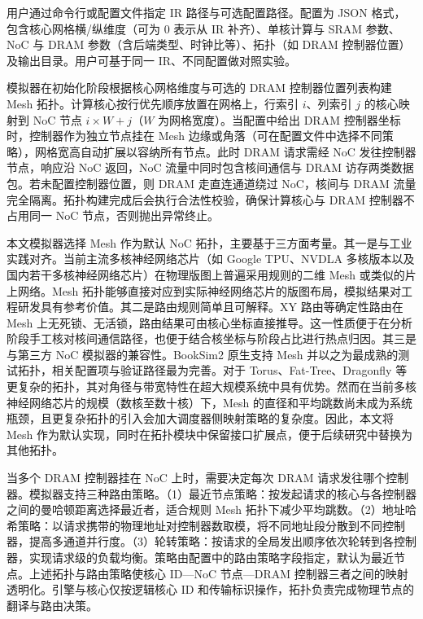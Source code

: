 
用户通过命令行或配置文件指定 IR 路径与可选配置路径。配置为 JSON 格式，包含核心网格横/纵维度（可为 0 表示从 IR 补齐）、单核计算与 SRAM 参数、NoC 与 DRAM 参数（含后端类型、时钟比等）、拓扑（如 DRAM 控制器位置）及输出目录。用户可基于同一 IR、不同配置做对照实验。

模拟器在初始化阶段根据核心网格维度与可选的 DRAM 控制器位置列表构建 Mesh 拓扑。计算核心按行优先顺序放置在网格上，行索引 $i$、列索引 $j$ 的核心映射到 NoC 节点 $i \times W + j$（$W$ 为网格宽度）。当配置中给出 DRAM 控制器坐标时，控制器作为独立节点挂在 Mesh 边缘或角落（可在配置文件中选择不同策略），网格宽高自动扩展以容纳所有节点。此时 DRAM 请求需经 NoC 发往控制器节点，响应沿 NoC 返回，NoC 流量中同时包含核间通信与 DRAM 访存两类数据包。若未配置控制器位置，则 DRAM 走直连通道绕过 NoC，核间与 DRAM 流量完全隔离。拓扑构建完成后会执行合法性校验，确保计算核心与 DRAM 控制器不占用同一 NoC 节点，否则抛出异常终止。

本文模拟器选择 Mesh 作为默认 NoC 拓扑，主要基于三方面考量。其一是与工业实践对齐。当前主流多核神经网络芯片（如 Google TPU、NVDLA 多核版本以及国内若干多核神经网络芯片）在物理版图上普遍采用规则的二维 Mesh 或类似的片上网络。Mesh 拓扑能够直接对应到实际神经网络芯片的版图布局，模拟结果对工程研发具有参考价值。其二是路由规则简单且可解释。XY 路由等确定性路由在 Mesh 上无死锁、无活锁，路由结果可由核心坐标直接推导。这一性质便于在分析阶段手工核对核间通信路径，也便于结合核坐标与阶段占比进行热点归因。其三是与第三方 NoC 模拟器的兼容性。BookSim2 原生支持 Mesh 并以之为最成熟的测试拓扑，相关配置项与验证路径最为完善。对于 Torus、Fat-Tree、Dragonfly 等更复杂的拓扑，其对角径与带宽特性在超大规模系统中具有优势。然而在当前多核神经网络芯片的规模（数核至数十核）下，Mesh 的直径和平均跳数尚未成为系统瓶颈，且更复杂拓扑的引入会加大调度器侧映射策略的复杂度。因此，本文将 Mesh 作为默认实现，同时在拓扑模块中保留接口扩展点，便于后续研究中替换为其他拓扑。

当多个 DRAM 控制器挂在 NoC 上时，需要决定每次 DRAM 请求发往哪个控制器。模拟器支持三种路由策略。（1）最近节点策略：按发起请求的核心与各控制器之间的曼哈顿距离选择最近者，适合规则 Mesh 拓扑下减少平均跳数。（2）地址哈希策略：以请求携带的物理地址对控制器数取模，将不同地址段分散到不同控制器，提高多通道并行度。（3）轮转策略：按请求的全局发出顺序依次轮转到各控制器，实现请求级的负载均衡。策略由配置中的路由策略字段指定，默认为最近节点。上述拓扑与路由策略使核心 ID—NoC 节点—DRAM 控制器三者之间的映射透明化。引擎与核心仅按逻辑核心 ID 和传输标识操作，拓扑负责完成物理节点的翻译与路由决策。

